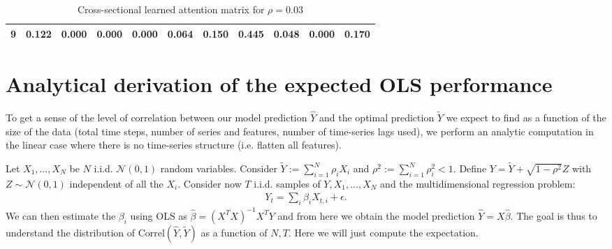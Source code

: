 \documentclass{article}
\begin{document}
\begin{table}[h]
\begin{tabular}{lcccccccccc}
9 & {\cellcolor[HTML]{C8CDE4}} \color[HTML]{000000} 0.122 & {\cellcolor[HTML]{FFF7FB}} \color[HTML]{000000} 0.000 & {\cellcolor[HTML]{FFF7FB}} \color[HTML]{000000} 0.000 & {\cellcolor[HTML]{FFF7FB}} \color[HTML]{000000} 0.000 & {\cellcolor[HTML]{E8E4F0}} \color[HTML]{000000} 0.064 & {\cellcolor[HTML]{B3C3DE}} \color[HTML]{000000} 0.150 & {\cellcolor[HTML]{023858}} \color[HTML]{F1F1F1} 0.445 & {\cellcolor[HTML]{EFE9F3}} \color[HTML]{000000} 0.048 & {\cellcolor[HTML]{FFF7FB}} \color[HTML]{000000} 0.000 & {\cellcolor[HTML]{A4BCDA}} \color[HTML]{000000} 0.170 \\
\bottomrule
\end{tabular}
\vskip 0.05in
\caption{Cross-sectional learned attention matrix for $\rho = 0.03$}
    \label{tab:attn_cs}
\end{table}

\section{Analytical derivation of the expected OLS performance}\label{app_theo}

To get a sense of the level of correlation between our model prediction $\widehat Y$ and the optimal prediction $\widetilde Y$ we expect to find as a function of the size of the data (total time steps, number of series and features, number of time-series lags used), we perform an analytic computation in the linear case where there is no time-series structure (i.e. flatten all features).

Let $X_1, \dots, X_N$ be $N$ i.i.d. $\mathcal{N}(0,1)$ random variables. Consider $\widetilde Y := \sum_{i=1}^N \rho_i X_i$ and $\rho^2 := \sum_{i=1}^N \rho^2_i < 1$. Define $Y = \widetilde Y + \sqrt{1 - \rho^2} Z$ with $Z \sim \mathcal{N}(0,1)$ independent of all the $X_i$. Consider now $T$ i.i.d. samples of $Y, X_1, \dots, X_N$ and the multidimensional regression problem:
\begin{align*}
Y_t = \sum_i \beta_i X_{t, i} + \epsilon.
\end{align*}
We can then estimate the $\beta_i$ using OLS as
$\widehat \beta = (X^T X)^{-1} X^T Y$
and from here we obtain the model prediction $\widehat Y = X \widehat \beta$. The goal is thus to understand the distribution of $\text{Correl}(\widehat Y, \widetilde Y )$ as a function of $N,T$. Here we will just compute the expectation.
\end{document}
